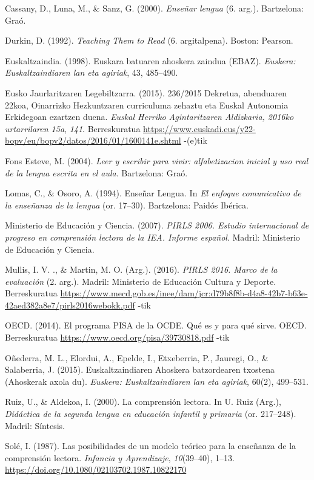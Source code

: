 \documentclass[]{book}
\begin{document}
Cassany, D., Luna, M., \& Sanz, G. (2000). \emph{Enseñar lengua} (6. arg.). Bartzelona: Graó.

Durkin, D. (1992). \emph{Teaching Them to Read} (6. argitalpena). Boston: Pearson.

Euskaltzaindia. (1998). Euskara batuaren ahoskera zaindua (EBAZ). \emph{Euskera: Euskaltzaindiaren lan eta agiriak}, 43, 485--490.

Eusko Jaurlaritzaren Legebiltzarra. (2015). 236/2015 Dekretua, abenduaren 22koa, Oinarrizko Hezkuntzaren curriculuma zehaztu eta Euskal Autonomia Erkidegoan ezartzen duena. \emph{Euskal Herriko Agintaritzaren Aldizkaria, 2016ko urtarrilaren 15a}, \emph{141}. Berreskuratua \url{https://www.euskadi.eus/y22-bopv/eu/bopv2/datos/2016/01/1600141e.shtml} -(e)tik

Fons Esteve, M. (2004). \emph{Leer y escribir para vivir: alfabetizacion inicial y uso real de la lengua escrita en el aula}. Bartzelona: Graó.

Lomas, C., \& Osoro, A. (1994). Enseñar Lengua. In \emph{El enfoque comunicativo de la enseñanza de la lengua} (or. 17--30). Bartzelona: Paidós Ibérica.

Ministerio de Educación y Ciencia. (2007). \emph{PIRLS 2006. Estudio internacional de progreso en comprensión lectora de la IEA. Informe español}. Madril: Ministerio de Educación y Ciencia.

Mullis, I. V. ., \& Martin, M. O. (Arg.). (2016). \emph{PIRLS 2016. Marco de la evaluación} (2. arg.). Madril: Ministerio de Educación Cultura y Deporte. Berreskuratua \url{https://www.mecd.gob.es/inee/dam/jcr:d79b8f8b-d4a8-42b7-b63e-42aed382a8e7/pirls2016webokk.pdf} -tik

OECD. (2014). El programa PISA de la OCDE. Qué es y para qué sirve. OECD. Berreskuratua \url{https://www.oecd.org/pisa/39730818.pdf} -tik

Oñederra, M. L., Elordui, A., Epelde, I., Etxeberria, P., Jauregi, O., \& Salaberria, J. (2015). Euskaltzaindiaren Ahoskera batzordearen txostena (Ahoskerak axola du). \emph{Euskera: Euskaltzaindiaren lan eta agiriak}, 60(2), 499--531.

Ruiz, U., \& Aldekoa, I. (2000). La comprensión lectora. In U. Ruiz (Arg.), \emph{Didáctica de la segunda lengua en educación infantil y primaria} (or. 217--248). Madril: Síntesis.

Solé, I. (1987). Las posibilidades de un modelo teórico para la enseñanza de la comprensión lectora. \emph{Infancia y Aprendizaje}, \emph{10}(39--40), 1--13. \url{https://doi.org/10.1080/02103702.1987.10822170}
\end{document}
